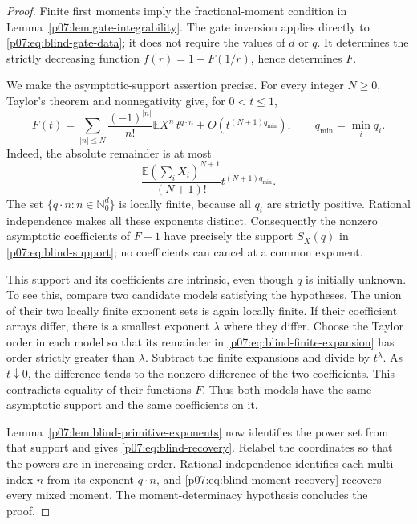 \documentclass[11pt,letterpaper]{article}
\theoremstyle{definition}
\theoremstyle{remark}
\newcommand{\E}{\mathbb E}
\newcommand{\1}{\mathbf 1}
\begin{document}
\begin{proof}
Finite first moments imply the fractional-moment condition in
Lemma~\ref{p07:lem:gate-integrability}. The gate inversion applies directly
to \eqref{p07:eq:blind-gate-data}; it does not require the values of $d$ or
$q$. It determines the strictly decreasing function
$f(r)=1-F(1/r)$, hence determines $F$.

We make the asymptotic-support assertion precise. For every integer
$N\geq0$, Taylor's theorem and nonnegativity give, for $0<t\leq1$,
\begin{equation}\label{p07:eq:blind-finite-expansion}
 F(t)=\sum_{|n|\leq N}\frac{(-1)^{|n|}}{n!}\E X^n\,t^{q\cdot n}
       +O\left(t^{(N+1)q_{\min}}\right),
 \qquad q_{\min}=\min_i q_i.
\end{equation}
Indeed, the absolute remainder is at most
\[
 \frac{\E(\sum_i X_i)^{N+1}}{(N+1)!}
             t^{(N+1)q_{\min}}.
\]
The set $\{q\cdot n:n\in\mathbb N_0^d\}$ is locally finite, because
all $q_i$ are strictly positive. Rational independence makes all these
exponents distinct. Consequently the nonzero asymptotic coefficients
of $F-1$ have precisely the support $S_X(q)$ in
\eqref{p07:eq:blind-support}; no coefficients can cancel at a common exponent.

This support and its coefficients are intrinsic, even though $q$ is
initially unknown. To see this, compare two candidate models satisfying
the hypotheses. The union of their two locally finite exponent sets is
again locally finite. If their coefficient arrays differ, there is a
smallest exponent $\lambda$ where they differ. Choose the Taylor order
in each model so that its remainder in
\eqref{p07:eq:blind-finite-expansion} has order strictly greater than
$\lambda$. Subtract the finite expansions and divide by $t^\lambda$.
As $t\downarrow0$, the difference tends to the nonzero difference of
the two coefficients. This contradicts equality of their functions $F$.
Thus both models have the same asymptotic support and the same
coefficients on it.

Lemma~\ref{p07:lem:blind-primitive-exponents} now identifies the power set
from that support and gives \eqref{p07:eq:blind-recovery}. Relabel the
coordinates so that the powers are in increasing order. Rational
independence identifies each multi-index $n$ from its exponent
$q\cdot n$, and \eqref{p07:eq:blind-moment-recovery} recovers every mixed
moment. The moment-determinacy hypothesis concludes the proof.
\end{proof}
\end{document}
